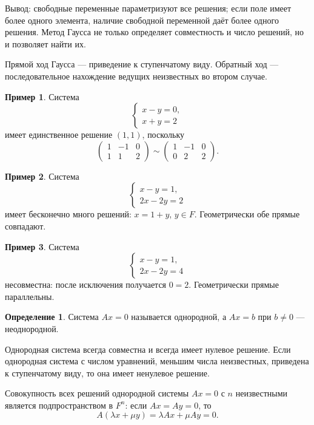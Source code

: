 \documentclass[12pt,a4paper,oneside,openany]{book}
\theoremstyle{definition}
\newtheorem{definition}{Определение}[chapter]
\newtheorem{example}{Пример}[chapter]
\theoremstyle{plain}
\theoremstyle{remark}
\begin{document}
Вывод: свободные переменные параметризуют все решения; если поле имеет
более одного элемента, наличие свободной переменной даёт более одного
решения. Метод Гаусса не только определяет совместность и число решений,
но и позволяет найти их.

Прямой ход Гаусса --- приведение к ступенчатому виду. Обратный ход ---
последовательное нахождение ведущих неизвестных во втором случае.


\begin{example}
Система
\[
  \begin{cases}x-y=0,\\x+y=2\end{cases}
\]
имеет единственное решение $(1,1)$, поскольку
\[
  \left(\begin{array}{cc|c}1&-1&0\\1&1&2\end{array}\right)
  \sim
  \left(\begin{array}{cc|c}1&-1&0\\0&2&2\end{array}\right).
\]
\end{example}

\begin{example}
Система
\[
  \begin{cases}x-y=1,\\2x-2y=2\end{cases}
\]
имеет бесконечно много решений: $x=1+y$, $y\in F$. Геометрически обе
прямые совпадают.
\end{example}

\begin{example}
Система
\[
  \begin{cases}x-y=1,\\2x-2y=4\end{cases}
\]
несовместна: после исключения получается $0=2$. Геометрически прямые
параллельны.
\end{example}

\begin{definition}
Система $Ax=0$ называется однородной, а $Ax=b$ при $b\ne0$ ---
неоднородной.
\end{definition}

Однородная система всегда совместна и всегда имеет нулевое решение.
Если однородная система с числом уравнений, меньшим числа неизвестных,
приведена к ступенчатому виду, то она имеет ненулевое решение.


Совокупность всех решений однородной системы $Ax=0$ с $n$ неизвестными
является подпространством в $F^n$: если $Ax=Ay=0$, то
\[
  A(\lambda x+\mu y)=\lambda Ax+\mu Ay=0.
\]
\end{document}

